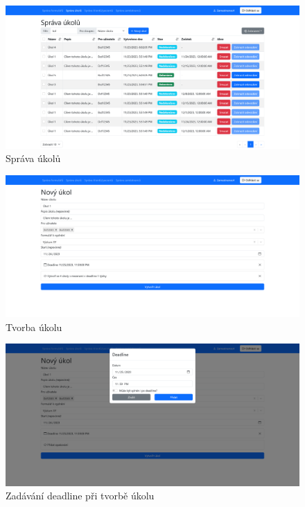 \begin{figure}[H]
    \centering
    \includegraphics[width=\textwidth]{../img/screenshots/sprava-ukolu}
    \caption{Správa úkolů}\label{fig:sprava-ukolu-screenshot}
\end{figure}

\begin{figure}[H]
    \centering
    \includegraphics[width=\textwidth]{../img/screenshots/tvorba-ukolu}
    \caption{Tvorba úkolu}\label{fig:tvorba-ukolu-screenshot}
\end{figure}

\begin{figure}[H]
    \centering
    \includegraphics[width=\textwidth]{../img/screenshots/tvorba-ukolu-deadline}
    \caption{Zadávání deadline při tvorbě úkolu}\label{fig:tvorba-ukolu-deadline-screenshot}
\end{figure}

